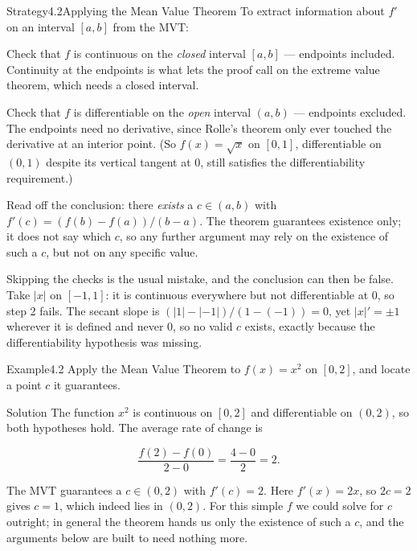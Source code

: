 \documentclass[a4paper,12pt,oneside]{memoir}
\begin{document}
\begin{envstrategy}{Strategy}{4.2}{Applying the Mean Value Theorem}
To extract information about \(f'\) on an interval \([a, b]\) from the MVT:

\begin{steps}
  \item Check that \(f\) is continuous on the \emph{closed} interval \([a, b]\) — endpoints included. Continuity at the endpoints is what lets the proof call on the extreme value theorem, which needs a closed interval.
  \item Check that \(f\) is differentiable on the \emph{open} interval \((a, b)\) — endpoints excluded. The endpoints need no derivative, since Rolle’s theorem only ever touched the derivative at an interior point. (So \(f(x) = \sqrt{x}\) on \([0, 1]\), differentiable on \((0, 1)\) despite its vertical tangent at \(0\), still satisfies the differentiability requirement.)
  \item Read off the conclusion: there \emph{exists} a \(c \in (a, b)\) with \(f'(c) = (f(b) - f(a))/(b - a)\). The theorem guarantees existence only; it does not say which \(c\), so any further argument may rely on the existence of such a \(c\), but not on any specific value.
\end{steps}
Skipping the checks is the usual mistake, and the conclusion can then be false. Take \(\lvert x \rvert\) on \([-1, 1]\): it is continuous everywhere but not differentiable at \(0\), so step 2 fails. The secant slope is \((\lvert 1 \rvert - \lvert -1 \rvert)/(1 - (-1)) = 0\), yet \(\lvert x \rvert' = \pm 1\) wherever it is defined and never \(0\), so no valid \(c\) exists, exactly because the differentiability hypothesis was missing.
\end{envstrategy}
\begin{workedexample}
\begin{envexample}{Example}{4.2}{}
Apply the Mean Value Theorem to \(f(x) = x^{2}\) on \([0, 2]\), and locate a point \(c\) it guarantees.
\end{envexample}
\begin{envsolution}{Solution}{}{}
The function \(x^{2}\) is continuous on \([0, 2]\) and differentiable on \((0, 2)\), so both hypotheses hold. The average rate of change is

\[ \frac{f(2) - f(0)}{2 - 0} = \frac{4 - 0}{2} = 2. \]

The MVT guarantees a \(c \in (0, 2)\) with \(f'(c) = 2\). Here \(f'(x) = 2x\), so \(2c = 2\) gives \(c = 1\), which indeed lies in \((0, 2)\). For this simple \(f\) we could solve for \(c\) outright; in general the theorem hands us only the existence of such a \(c\), and the arguments below are built to need nothing more. \qedmark
\end{envsolution}
\end{workedexample}
\end{document}
